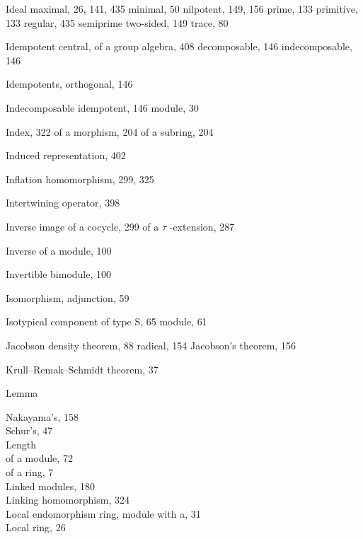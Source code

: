 
Ideal maximal, 26, 141, 435 minimal, 50 nilpotent, 149, 156 prime, 133 primitive, 133 regular, 435 semiprime two-sided, 149 trace, 80

Idempotent central, of a group algebra, 408 decomposable, 146 indecomposable, 146

Idempotents, orthogonal, 146

Indecomposable idempotent, 146 module, 30

Index, 322 of a morphism, 204 of a subring, 204

Induced representation, 402

Inflation homomorphism, 299, 325

Intertwining operator, 398

Inverse image of a cocycle, 299 of a \(\tau\) -extension, 287

Inverse of a module, 100

Invertible bimodule, 100

Isomorphism, adjunction, 59

Isotypical component of type S, 65 module, 61


Jacobson density theorem, 88 radical, 154 Jacobson's theorem, 156


Krull--Remak--Schmidt theorem, 37


Lemma

Nakayama's, 158\\
Schur's, 47\\
Length\\
of a module, 72\\
of a ring, 7\\
Linked modules, 180\\
Linking homomorphism, 324\\
Local endomorphism ring, module with a, 31\\
Local ring, 26



